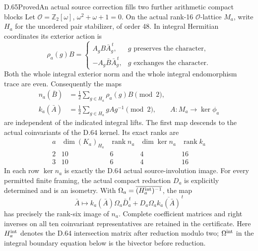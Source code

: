 \begin{statement}{D.65}{Proved}{An actual source correction fills two further arithmetic compact blocks}
Let \(\mathcal O=\mathbb Z_2[\omega]\),
\(\omega^2+\omega+1=0\). On the actual rank-16
\(\mathcal O\)-lattice \(M_a\), write \(H_a\) for the unordered pair
stabilizer, of order 48. In integral Hermitian coordinates its exterior
action is
\[
 \rho_a(g)B=
 \begin{cases}
 A_gB\bar A_g^{\,t},&g\text{ preserves the character},\\
 -A_g\bar B\bar A_g^{\,t},&g\text{ exchanges the character}.
 \end{cases}
 \tag{D.65.5}
\]
Both the whole integral exterior norm and the whole integral
endomorphism trace are even. Consequently the maps
\[
 \begin{aligned}
 n_a(\bar B)&=\frac12\sum_{g\in H_a}\rho_a(g)B\pmod2,\\
 k_a(\bar A)&=\frac12\sum_{g\in H_a}gAg^{-1}\pmod2,
 \qquad A:M_a\longrightarrow\ker\phi_a
 \end{aligned}
 \tag{D.65.6}
\]
are independent of the indicated integral lifts. The first map descends
to the actual coinvariants of the D.64 kernel. Its exact ranks are
\[
 \begin{array}{c|r|r|r|r}
 a&\dim(K_a)_{H_a}&\operatorname{rank}n_a
      &\dim\ker n_a&\operatorname{rank}k_a\\\hline
 2&10&6&4&16\\
 3&10&6&4&16
 \end{array}
 \tag{D.65.7}
\]
In each row \(\ker n_a\) is exactly the D.64 actual source-involution
image. For every permitted finite framing, the actual compact reduction
\(D_a\) is explicitly determined and is an isometry. With
\(\Omega_a=\overline{(H_a^{\rm int})^{-1}}\), the map
\[
 \bar A\longmapsto
 k_a(\bar A)\Omega_a\bar D_a^{\,t}
             +D_a\Omega_a\overline{k_a(\bar A)}^{\,t}
 \tag{D.65.8}
\]
has precisely the rank-six image of \(n_a\). Complete coefficient
matrices and right inverses on all ten coinvariant representatives are
retained in the certificate.
Here \(H_a^{\rm int}\) denotes the D.64 intersection matrix after
reduction modulo two; \(\Omega^{\rm int}\) in the integral boundary
equation below is the bivector before reduction.


\end{statement}
